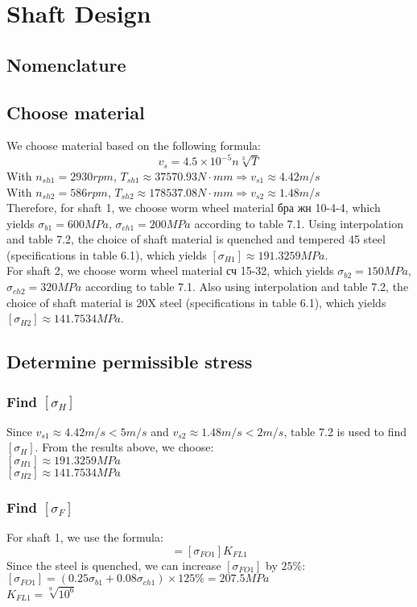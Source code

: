 \chapter{Shaft Design}
\section{Nomenclature	}
\section{Choose material}
We choose material based on the following formula:
\begin{equation}
	v_s=4.5\times10^{-5}n\sqrt[3]{T}
\end{equation}
With $ n_{sh1} = 2930\unit{rpm} $, $ T_{sh1} \approx 37570.93\unit{N\cdot mm} \Rightarrow v_{s1} \approx 4.42 \unit{m/s}$\\
With $ n_{sh2} = 586\unit{rpm} $, $ T_{sh2} \approx 178537.08\unit{N\cdot mm} \Rightarrow v_{s2} \approx 1.48 \unit{m/s}$\\
Therefore, for shaft 1, we choose worm wheel material \foreignlanguage{russian}{бра жн} 10-4-4, which yields $ \sigma_{b1}=600\unit{MPa} $, $ \sigma_{ch1} = 200\unit{MPa} $ according to table 7.1. Using interpolation and table 7.2, the choice of shaft material is quenched and tempered 45 steel (specifications in table 6.1), which yields $ [\sigma_{H1}] \approx 191.3259 \unit{MPa}$.\\
For shaft 2, we choose worm wheel material \foreignlanguage{russian}{сч} 15-32, which yields $ \sigma_{b2}=150\unit{MPa} $, $ \sigma_{ch2} = 320\unit{MPa} $ according to table 7.1. Also using interpolation and table 7.2, the choice of shaft material is 20X steel (specifications in table 6.1), which yields $ [\sigma_{H2}] \approx 141.7534 \unit{MPa}$.

\section{Determine permissible stress}

\subsection{Find $ [\sigma_H] $}
Since $v_{s1} \approx 4.42 \unit{m/s} < 5\unit{m/s}$ and $v_{s2} \approx 1.48 \unit{m/s} < 2\unit{m/s}$, table 7.2 is used to find $ [\sigma_H] $. From the results above, we choose:\\
$ [\sigma_{H1}] \approx 191.3259 \unit{MPa}$\\
$ [\sigma_{H2}] \approx 141.7534 \unit{MPa}$

\subsection{Find $ [\sigma_F] $}
For shaft 1, we use the formula:
\begin{equation}
	[\sigma_{F1}] = [\sigma_{FO1}]K_{FL1}
\end{equation}
Since the steel is quenched, we can increase $ [\sigma_{FO1}] $ by $ 25\% $:\\
$ [\sigma_{FO1}] = (0.25\sigma_{b1} + 0.08\sigma_{ch1})\times125\% = 207.5\unit{MPa} $\\
$ K_{FL1} = \sqrt[9]{10^6}$